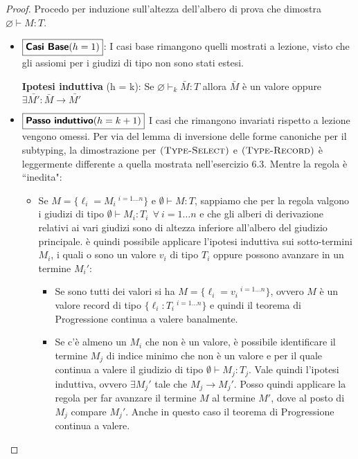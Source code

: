 \begin{proof}
Procedo per induzione sull'altezza dell'albero di prova che dimostra
$\varnothing \vdash M : T$.
\begin{itemize}
	\item $\boxed{\text{\textbf{Casi Base}} (h = 1)}$: I casi base rimangono
	quelli mostrati a lezione, visto che gli assiomi per i giudizi di tipo non
	sono stati estesi. \vspace{.5em}

	\noindent \textbf{Ipotesi induttiva} (h = k): Se $\varnothing \vdash_{k} \bar{M} : T$ allora $\bar{M}$ \`e un valore oppure $\exists
	\bar{M'}: \bar{M} \longrightarrow \bar{M'}$
	\item $\boxed{\text{\textbf{Passo induttivo}} (h = k+1)}$ I casi che rimangono invariati rispetto a lezione vengono omessi. Per via
	del lemma di inversione delle forme canoniche per il subtyping, la
	dimostrazione per $\textsc{(Type-Select)}$ e $\textsc{(Type-Record)}$
	\`e leggermente differente a quella mostrata nell'esercizio 6.3. Mentre la regola  \`e ``inedita":
	

	\begin{itemize}
		\item {} Se $M = \{ \ell_i = M_i \:^{i = 1 \ldots n} \}$ e $\emptyset \vdash M : T$, sappiamo che per la regola  valgono i giudizi di tipo
		$\emptyset \vdash M_i : T_i \:\ \forall \: i = 1\ldots n$ e che gli alberi di derivazione relativi ai vari giudizi sono di altezza inferiore all'albero del giudizio principale.
		\`e quindi possibile applicare l'ipotesi induttiva sui sotto-termini $M_i$, i quali o sono un valore $v_i$ di tipo $T_i$ oppure possono avanzare in un termine $M_i'$:
		\begin{itemize}
			\item Se sono tutti dei valori si ha $M = \{ \ell_i = v_i \:^{i = 1 \ldots n} \}$, ovvero $M$ \`e un valore record di tipo $\{ \ell_i : T_i \:^{i = 1 \ldots n} \}$ e quindi il teorema di Progressione continua a valere banalmente.
			\item Se c'\`e almeno un $M_i$ che non \`e un valore, \`e possibile identificare il termine $M_j$ di indice minimo che non \`e un valore e per il quale continua a valere il giudizio di tipo $\emptyset \vdash M_j : T_j$. Vale quindi l'ipotesi induttiva, ovvero $\exists M_j'$ tale che $M_j \to M_j'$. Posso quindi applicare la regola  per far avanzare il termine $M$ al termine $M'$, dove al posto di $M_j$ compare $M_j'$. Anche in questo caso il teorema di Progressione continua a valere.
		\end{itemize}
	

\end{itemize}
\end{itemize}
\end{proof}
